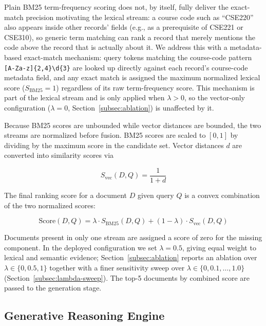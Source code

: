 \documentclass[a4paper,twoside]{article}
\begin{document}
Plain BM25 term-frequency scoring does not, by itself, fully deliver the exact-match precision motivating the lexical stream: a course code such as ``CSE220'' also appears inside other records' fields (e.g., as a prerequisite of CSE221 or CSE310), so generic term matching can rank a record that merely mentions the code above the record that is actually about it. We address this with a metadata-based exact-match mechanism: query tokens matching the course-code pattern \texttt{[A-Za-z]\{2,4\}\textbackslash d\{3\}} are looked up directly against each record's course-code metadata field, and any exact match is assigned the maximum normalized lexical score ($S_{\mathrm{BM25}}=1$) regardless of its raw term-frequency score. This mechanism is part of the lexical stream and is only applied when $\lambda>0$, so the vector-only configuration ($\lambda=0$, Section~\ref{subsec:ablation}) is unaffected by it.

Because BM25 scores are unbounded while vector distances are bounded, the two streams are normalized before fusion. BM25 scores are scaled to $[0,1]$ by dividing by the maximum score in the candidate set. Vector distances $d$ are converted into similarity scores via

\begin{equation}\label{eq:vecsim}
S_{\mathrm{vec}}(D,Q) = \frac{1}{1+d}
\end{equation}

The final ranking score for a document $D$ given query $Q$ is a convex combination of the two normalized scores:

\begin{equation}\label{eq:fusion}
\mathrm{Score}(D,Q) = \lambda \cdot S_{\mathrm{BM25}}(D,Q) + (1-\lambda) \cdot S_{\mathrm{vec}}(D,Q)
\end{equation}

Documents present in only one stream are assigned a score of zero for the missing component. In the deployed configuration we set $\lambda=0.5$, giving equal weight to lexical and semantic evidence; Section~\ref{subsec:ablation} reports an ablation over $\lambda \in \{0, 0.5, 1\}$ together with a finer sensitivity sweep over $\lambda\in\{0,0.1,\ldots,1.0\}$ (Section~\ref{subsec:lambda-sweep}). The top-5 documents by combined score are passed to the generation stage.

\subsection{Generative Reasoning Engine}
\label{subsec:generation}
\end{document}
